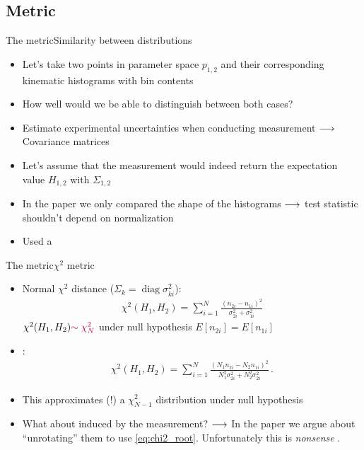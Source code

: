 \subsection{Metric}
\begin{frame}{The metric}{Similarity between distributions}
	\begin{itemize}[<+->]
		\item Let's take two points in parameter space $p_{1,2}$ and their corresponding kinematic histograms  with bin contents 
		\item How well would we be able to distinguish between both cases?
		\item Estimate experimental uncertainties when conducting measurement  $\longrightarrow$ Covariance matrices  
		\item Let's assume that the measurement would indeed return the expectation value $H_{1,2}$ with $\Sigma_{1,2}$
		\item In the paper we only compared the shape of the histograms $\longrightarrow$ test statistic shouldn't depend on normalization
		\item Used a  	
	\end{itemize}
\end{frame}

\begin{frame}{The metric}{$\chi^2$ metric}
	\begin{itemize}[<+->]
		\item Normal $\chi^2$ distance ($\Sigma_k = \operatorname{diag}\sigma_{ki}^2$): 
		\begin{align}
		\chi^2(H_1, H_2) = \sum_{i=1}^N \frac{(n_{2i}-n_{1i})^2}{\sigma_{2i}^2+\sigma_{1i}^2}
		\label{eq:chi2_nonorm}
		\end{align}
		$\chi^2(H_1,H_2){\color{purple}\sim \chi^2_N}$ under null hypothesis $E[n_{2i}]=E[n_{1i}]$
		\item {} :
		\begin{align}
		  \chi^2(H_1, H_2) = \sum_{i=1}^N \frac{(N_1n_{2i}-N_2n_{1i})^2}{N_1^2\sigma_{2i}^2+N_2^2\sigma_{2i}^2}\,.
		  \label{eq:chi2_root}
		\end{align}
		\item This approximates (!) a $\chi^2_{N-1}$ distribution under null hypothesis 
		\item What about  induced by the measurement? $\longrightarrow$ In the paper we argue about \enquote{unrotating} them to use \eqref{eq:chi2_root}. Unfortunately this is \emph{nonsense} . 
	\end{itemize}
\end{frame}

